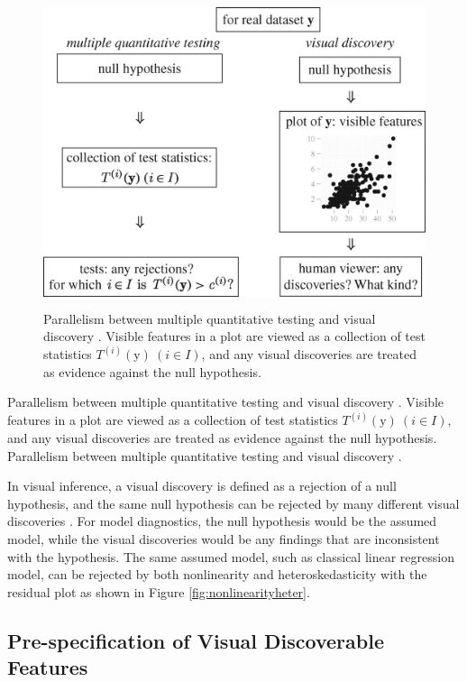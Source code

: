 \documentclass{monashthesis}
\begin{document}
\begin{figure}
\centering
\includegraphics[width=4.6875in,height=3.55208in]{figures/rsta2009012001.jpg}
\caption{Parallelism between multiple quantitative testing and visual discovery \autocite{buja_statistical_2009}. Visible features in a plot are viewed as a collection of test statistics \(T^{(i)}(\boldsymbol{\mathrm{y}})~(i \in I)\), and any visual discoveries are treated as evidence against the null hypothesis. \label{fig:parallelism}}
\end{figure}

Parallelism between multiple quantitative testing and visual discovery \autocite{buja_statistical_2009}. Visible features in a plot are viewed as a collection of test statistics \(T^{(i)}(\boldsymbol{\mathrm{y}})~(i \in I)\), and any visual discoveries are treated as evidence against the null hypothesis. Parallelism between multiple quantitative testing and visual discovery \autocite{buja_statistical_2009}.

In visual inference, a visual discovery is defined as a rejection of a null hypothesis, and the same null hypothesis can be rejected by many different visual discoveries \autocite{buja_statistical_2009}. For model diagnostics, the null hypothesis would be the assumed model, while the visual discoveries would be any findings that are inconsistent with the hypothesis. The same assumed model, such as classical linear regression model, can be rejected by both nonlinearity and heteroskedasticity with the residual plot as shown in Figure \ref{fig:nonlinearityheter}.

\hypertarget{pre-specification-of-visual-discoverable-features-1}{%
\subsection{Pre-specification of Visual Discoverable Features}\label{pre-specification-of-visual-discoverable-features-1}}
\end{document}
